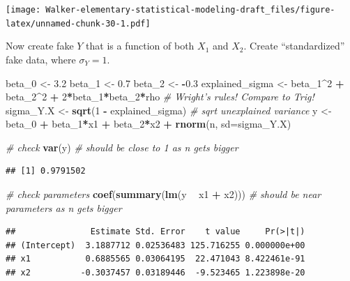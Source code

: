 \documentclass[]{book}
\newenvironment{Shaded}{\begin{snugshade}}{\end{snugshade}}
\newcommand{\KeywordTok}[1]{\textcolor[rgb]{0.13,0.29,0.53}{\textbf{#1}}}
\newcommand{\DataTypeTok}[1]{\textcolor[rgb]{0.13,0.29,0.53}{#1}}
\newcommand{\DecValTok}[1]{\textcolor[rgb]{0.00,0.00,0.81}{#1}}
\newcommand{\FloatTok}[1]{\textcolor[rgb]{0.00,0.00,0.81}{#1}}
\newcommand{\StringTok}[1]{\textcolor[rgb]{0.31,0.60,0.02}{#1}}
\newcommand{\CommentTok}[1]{\textcolor[rgb]{0.56,0.35,0.01}{\textit{#1}}}
\newcommand{\OperatorTok}[1]{\textcolor[rgb]{0.81,0.36,0.00}{\textbf{#1}}}
\newcommand{\NormalTok}[1]{#1}
\begin{document}
\texttt{[image: Walker-elementary-statistical-modeling-draft\_files/figure-latex/unnamed-chunk-30-1.pdf]}

Now create fake \(Y\) that is a function of both \(X_1\) and \(X_2\).
Create ``standardized'' fake data, where \(\sigma_Y = 1\).

\begin{Shaded}
\begin{Highlighting}[]
\NormalTok{beta_}\DecValTok{0}\NormalTok{ <-}\StringTok{ }\FloatTok{3.2}
\NormalTok{beta_}\DecValTok{1}\NormalTok{ <-}\StringTok{ }\FloatTok{0.7}
\NormalTok{beta_}\DecValTok{2}\NormalTok{ <-}\StringTok{ }\OperatorTok{-}\FloatTok{0.3}
\NormalTok{explained_sigma <-}\StringTok{ }\NormalTok{beta_}\DecValTok{1}\OperatorTok{^}\DecValTok{2} \OperatorTok{+}\StringTok{ }\NormalTok{beta_}\DecValTok{2}\OperatorTok{^}\DecValTok{2} \OperatorTok{+}\StringTok{ }\DecValTok{2}\OperatorTok{*}\NormalTok{beta_}\DecValTok{1}\OperatorTok{*}\NormalTok{beta_}\DecValTok{2}\OperatorTok{*}\NormalTok{rho }\CommentTok{# Wright's rules! Compare to Trig!}
\NormalTok{sigma_Y.X <-}\StringTok{ }\KeywordTok{sqrt}\NormalTok{(}\DecValTok{1} \OperatorTok{-}\StringTok{ }\NormalTok{explained_sigma) }\CommentTok{# sqrt unexplained variance}
\NormalTok{y <-}\StringTok{ }\NormalTok{beta_}\DecValTok{0} \OperatorTok{+}\StringTok{ }\NormalTok{beta_}\DecValTok{1}\OperatorTok{*}\NormalTok{x1 }\OperatorTok{+}\StringTok{ }\NormalTok{beta_}\DecValTok{2}\OperatorTok{*}\NormalTok{x2 }\OperatorTok{+}\StringTok{ }\KeywordTok{rnorm}\NormalTok{(n, }\DataTypeTok{sd=}\NormalTok{sigma_Y.X)}

\CommentTok{# check}
\KeywordTok{var}\NormalTok{(y) }\CommentTok{# should be close to 1 as n gets bigger}
\end{Highlighting}
\end{Shaded}

\begin{verbatim}
## [1] 0.9791502
\end{verbatim}

\begin{Shaded}
\begin{Highlighting}[]
\CommentTok{# check parameters}
\KeywordTok{coef}\NormalTok{(}\KeywordTok{summary}\NormalTok{(}\KeywordTok{lm}\NormalTok{(y }\OperatorTok{~}\StringTok{ }\NormalTok{x1 }\OperatorTok{+}\StringTok{ }\NormalTok{x2))) }\CommentTok{# should be near parameters as n gets bigger}
\end{Highlighting}
\end{Shaded}

\begin{verbatim}
##               Estimate Std. Error    t value     Pr(>|t|)
## (Intercept)  3.1887712 0.02536483 125.716255 0.000000e+00
## x1           0.6885565 0.03064195  22.471043 8.422461e-91
## x2          -0.3037457 0.03189446  -9.523465 1.223898e-20
\end{verbatim}
\end{document}
